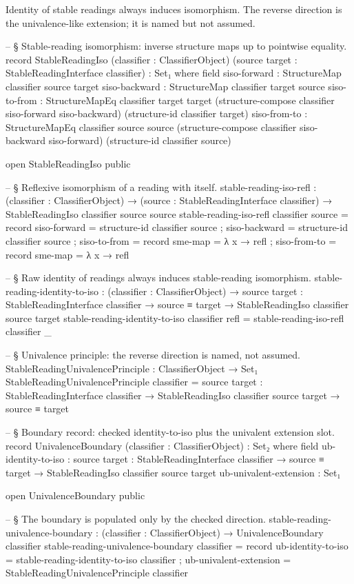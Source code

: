 \documentclass[11pt]{article}
\begin{document}
Identity of stable readings always induces isomorphism.  The reverse
direction is the univalence-like extension; it is named but not assumed.

\begin{code}
-- § Stable-reading isomorphism: inverse structure maps up to pointwise equality.
record StableReadingIso (classifier : ClassifierObject)
                        (source target : StableReadingInterface classifier) : Set₁ where
  field
    siso-forward : StructureMap classifier source target
    siso-backward : StructureMap classifier target source
    siso-to-from : StructureMapEq classifier target target
      (structure-compose classifier siso-forward siso-backward)
      (structure-id classifier target)
    siso-from-to : StructureMapEq classifier source source
      (structure-compose classifier siso-backward siso-forward)
      (structure-id classifier source)

open StableReadingIso public

-- § Reflexive isomorphism of a reading with itself.
stable-reading-iso-refl :
  (classifier : ClassifierObject) →
  (source : StableReadingInterface classifier) → StableReadingIso classifier source source
stable-reading-iso-refl classifier source = record
  { siso-forward  = structure-id classifier source
  ; siso-backward = structure-id classifier source
  ; siso-to-from  = record { sme-map = λ x → refl }
  ; siso-from-to  = record { sme-map = λ x → refl }
  }

-- § Raw identity of readings always induces stable-reading isomorphism.
stable-reading-identity-to-iso :
  (classifier : ClassifierObject) →
  {source target : StableReadingInterface classifier} →
  source ≡ target → StableReadingIso classifier source target
stable-reading-identity-to-iso classifier refl = stable-reading-iso-refl classifier _

-- § Univalence principle: the reverse direction is named, not assumed.
StableReadingUnivalencePrinciple : ClassifierObject → Set₁
StableReadingUnivalencePrinciple classifier =
  {source target : StableReadingInterface classifier} →
  StableReadingIso classifier source target → source ≡ target

-- § Boundary record: checked identity-to-iso plus the univalent extension slot.
record UnivalenceBoundary (classifier : ClassifierObject) : Set₂ where
  field
    ub-identity-to-iso :
      {source target : StableReadingInterface classifier} →
      source ≡ target → StableReadingIso classifier source target
    ub-univalent-extension : Set₁

open UnivalenceBoundary public

-- § The boundary is populated only by the checked direction.
stable-reading-univalence-boundary :
  (classifier : ClassifierObject) → UnivalenceBoundary classifier
stable-reading-univalence-boundary classifier = record
  { ub-identity-to-iso     = stable-reading-identity-to-iso classifier
  ; ub-univalent-extension = StableReadingUnivalencePrinciple classifier
  }
\end{code}
\end{document}
